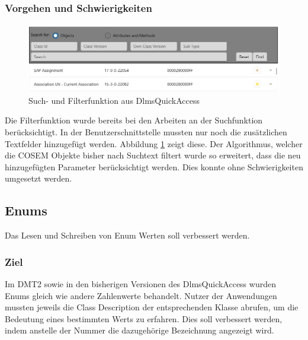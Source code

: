 \subsubsection{Vorgehen und Schwierigkeiten}
\begin{figure}
   \centering
   \includegraphics[width=1.0\textwidth]{gfx/searchfilter.png}
   \caption{
      Such- und Filterfunktion aus DlmsQuickAccess 
      }
      \label{fig:searchfilterUIRel}
\end{figure}
Die Filterfunktion wurde bereits bei den Arbeiten an der Suchfunktion berücksichtigt.
In der Benutzerschnittstelle mussten nur noch die zusätzlichen Textfelder hinzugefügt werden.
Abbildung \ref{fig:searchfilterUIRel} zeigt diese.
Der Algorithmus, welcher die \ac{COSEM} Objekte bisher nach Suchtext filtert wurde so erweitert, dass die neu hinzugefügten Parameter berücksichtigt werden.
Dies konnte ohne Schwierigkeiten umgesetzt werden.



\subsection{Enums}
\dq Das Lesen und Schreiben von Enum Werten soll verbessert werden.\dq
\subsubsection{Ziel}
Im \ac{DMT2} sowie in den bisherigen Versionen des DlmsQuickAccess wurden Enums gleich wie andere Zahlenwerte behandelt.
Nutzer der Anwendungen mussten jeweils die Class Description der entsprechenden Klasse abrufen, um die Bedeutung eines bestimmten Werts zu erfahren.
Dies soll verbessert werden, indem anstelle der Nummer die dazugehörige Bezeichnung angezeigt wird.

